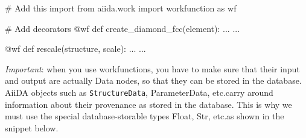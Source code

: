 \begin{pythoncommand}
# Add this import
from aiida.work import workfunction as wf
 
# Add decorators
@wf
def create_diamond_fcc(element):
    ...
    ...
 
@wf
def rescale(structure, scale):
    ...
    ...
\end{pythoncommand}

\emph{Important}: when you use workfunctions, you have to make sure that their input and output are actually Data nodes, so that they can be stored in the database. AiiDA objects such as \texttt{StructureData}, ParameterData, etc.\@ carry around information about their provenance as stored in the database. This is why we must use the special database-storable types Float, Str, etc.\@ as shown in the snippet below.

